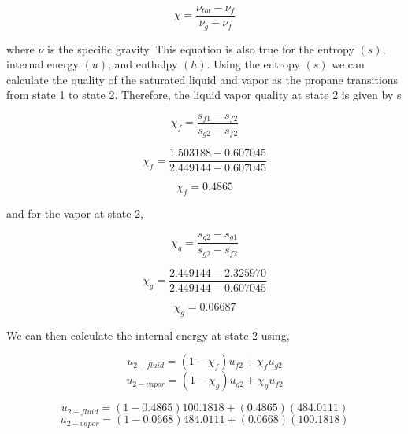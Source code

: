 \documentclass[10pt,parskip=half,
toc=sectionentrywithdots,
bibliography=totocnumbered,
captions=tableheading,numbers=noendperiod]{scrartcl}
\begin{document}
\begin{equation}\chi = \frac{\nu_{tot} - \nu_f}{\nu_g-\nu_f}\end{equation}

where \(\nu\) is the specific gravity. This equation is also true for
the entropy \((s)\), internal energy \((u)\), and enthalpy \((h)\).
Using the entropy \((s)\) we can calculate the quality of the saturated
liquid and vapor as the propane transitions from state 1 to state 2.
Therefore, the liquid vapor quality at state 2 is given by s

\begin{equation}\chi_f = \frac{s_{f1} - s_{f2}}{s_{g2}-s_{f2}}\end{equation}

\begin{equation}\chi_f = \frac{1.503188 - 0.607045}{2.449144-0.607045}\end{equation}

\begin{equation}\chi_f = 0.4865\end{equation}

and for the vapor at state 2,

\begin{equation}\chi_g = \frac{s_{g2} - s_{g1}}{s_{g2}-s_{f2}}\end{equation}

\begin{equation}\chi_g= \frac{2.449144 - 2.325970}{2.449144-0.607045}\end{equation}

\begin{equation}\chi_g = 0.06687\end{equation}

We can then calculate the internal energy at state 2 using,

\begin{equation}u_{2-fluid} = (1-\chi_f)u_{f2} + \chi_f u_{g2}\end{equation}
\begin{equation}u_{2-vapor} = (1-\chi_g)u_{g2} + \chi_g u_{f2}\end{equation}

\begin{equation}u_{2-fluid} = (1-0.4865)100.1818 + (0.4865)(484.0111)\end{equation}
\begin{equation}u_{2-vapor} = (1-0.0668)484.0111 + (0.0668)(100.1818)\end{equation}
\end{document}
